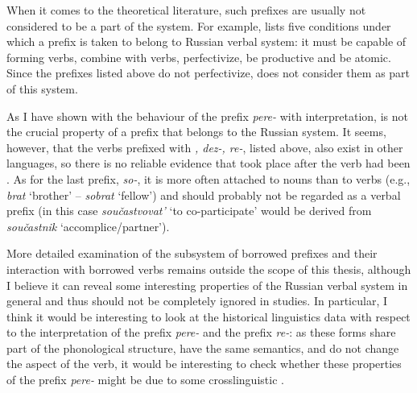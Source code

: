 When it comes to the theoretical literature, such prefixes are usually not considered to be a part of the system. For example, \citet[101-105]{Krongauz:98} lists five conditions under which a prefix is taken to belong to Russian verbal  system: it must be capable of forming verbs, combine with verbs, perfectivize, be productive and be atomic. Since the prefixes listed above do not perfectivize, \citet[103]{Krongauz:98} does not consider them as part of this system.

As I have shown with the behaviour of the prefix \textit{pere-} with  interpretation,  is not the crucial property of a prefix that belongs to the Russian  system. It seems, however, that the verbs prefixed with \textit{, dez-, re-}, listed above, also exist in other languages, so there is no reliable evidence that  took place after the verb had been . As for the last prefix, \textit{so-}, it is more often attached to nouns than to verbs (e.g., \textit{brat} `brother' -- \textit{sobrat} `fellow') and should probably not be regarded as a verbal prefix (in this case \textit{sou\v{c}astvovat'} `to co-participate' would be derived from \textit{sou\v{c}astnik} `accomplice/partner'). 

More detailed examination of the subsystem of borrowed prefixes and their interaction with borrowed verbs remains outside the scope of this thesis, although I believe it can reveal some interesting properties of the Russian verbal  system in general and thus should not be completely ignored in  studies. In particular, I think it would be interesting to look at the historical linguistics data with respect to the  interpretation of the prefix \textit{pere-} and the  prefix \textit{re-}: as these forms share part of the phonological structure, have the same semantics, and do not change the aspect of the verb, it would be interesting to check whether these properties of the  prefix \textit{pere-} might be due to some crosslinguistic . 



